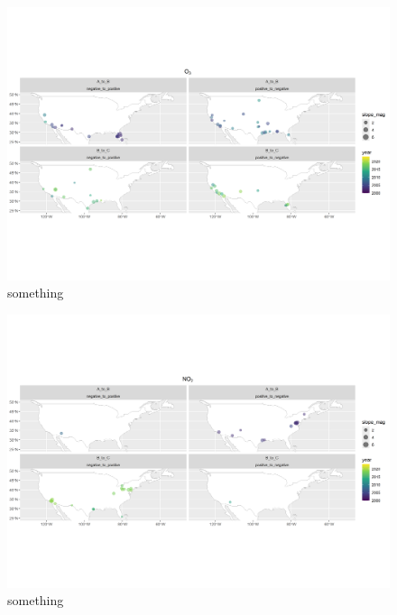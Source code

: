 \documentclass[journal abbreviation, manuscript]{copernicus}
\begin{document}
\begin{figure}[t]
\includegraphics[width=12cm]{plots/US_o3_tau_0.5_changepoint_year_mag_map.png}
\caption{something}
\label{us_o3_changepoint_map}
\end{figure}

\begin{figure}[t]
\includegraphics[width=12cm]{plots/US_no2_tau_0.5_changepoint_year_mag_map.png}
\caption{something}
\label{us_no2_changepoint_map}
\end{figure}
\end{document}

